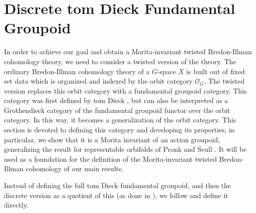 \documentclass[12pt,reqno]{amsart}
\newcommand{\printname}[1]{}
\renewcommand{\printname}[1]
	{{\color{brown}{\makebox[0pt]{\hspace{-1in}\raisebox{8pt}{\tiny #1}}}}}
\newcommand{\labell}[1]{\label{#1} \printname{#1}}
\theoremstyle{plain}
\theoremstyle{definition}
\begin{document}
\section{Discrete tom Dieck Fundamental Groupoid}\labell{s:fund gpd}

In order to achieve our goal and obtain a Morita-invariant twisted Bredon-Illman cohomology theory, we need to consider a twisted version of the theory.  The ordinary Bredon-Illman cohomology theory of a $G$-space $X$ is built out of fixed set data which is organized and indexed by the orbit category $\mathcal{O}_G$.  The twisted version replaces this orbit category with a fundamental groupoid category.   This category was first defined by tom Dieck \cite[Section 10.9]{tomDieck}, but can also be interpreted as a Grothendieck category of the fundamental groupoid functor over the orbit category.  In this way, it becomes a generalization of the orbit category.   This section is devoted to defining this category and developing its properties; in particular, we show that it is a Morita invariant of an action groupoid, generalizing the result for representable orbifolds of Pronk and Scull \cite{PS:fund-gpd}.   It will be used as a foundation for the definition of the Morita-invariant twisted Bredon-Illman cohomology of our main results. 

Instead of defining the full tom Dieck fundamental groupoid, and then the discrete version as a quotient of this (as done in \cite{tomDieck,PS:fund-gpd}), we follow \cite{MuMu} and define it directly.
\end{document}
